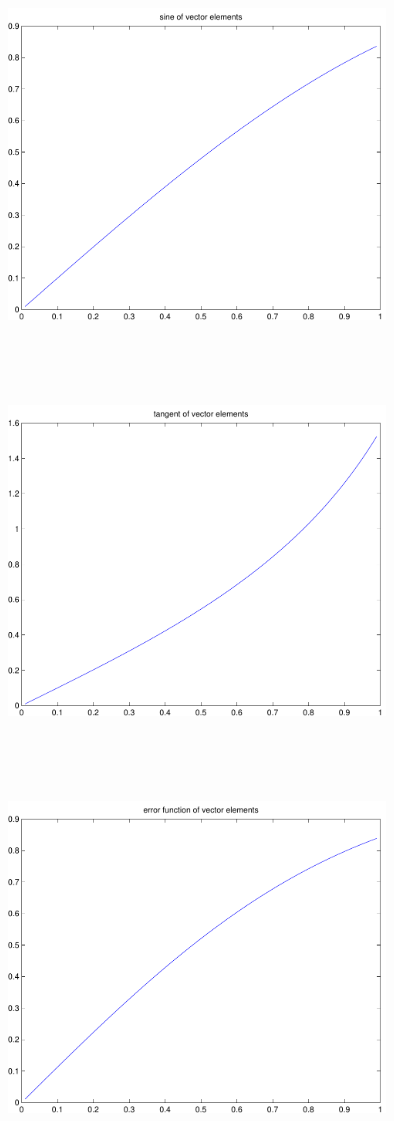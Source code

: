 \documentclass[9pt]{article}
\theoremstyle{plain}
\theoremstyle{definition}
\theoremstyle{remark}
\numberwithin{equation}{section}
\begin{document}
\includegraphics[width=10.0cm,height=10.0cm]{klVSLSin.pdf}

\includegraphics[width=10.0cm,height=10.0cm]{klVSLTan.pdf}

\includegraphics[width=10.0cm,height=10.0cm]{klVSLErf.pdf}
\end{document}
